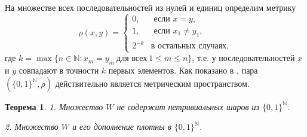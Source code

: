 \documentclass[12pt]{article}
\newtheorem{thm}{Теорема}
\def\N{{\mathbb{N}}}
\begin{document}

На множестве всех последовательностей из нулей и единиц определим метрику
$$
	\rho(x,y)=
	\begin{cases}
		0, & \mbox{~если~} x=y, \\
		1, & \mbox{~если~} x_1\neq y_1, \\
		2^{-k} & \mbox{в остальных случаях}, %
	\end{cases}
$$
где $k=\max\{n\in\N : x_m=y_m \ \text{для всех} \ 1\le m\le n\}$,
т.е. у последовательностей $x$ и $y$ совпадают в точности $k$ первых элементов.
Как показано в \cite[Утверждение 2.1.8]{Edgar}, пара $(\{0,1\}^\N, \rho)$ действительно является метрическим пространством.

\begin{thm}
1. Множество $W$ не содержит нетривиальных шаров из $\{0,1\}^\N$.

2. Множество $W$ и его дополнение плотны в $\{0,1\}^\N$.
\end{thm}
\end{document}
